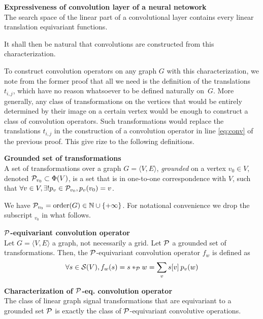 \begin{claim}\textbf{Expressiveness of convolution layer of a neural netowork}\\
The search space of the linear part of a convolutional layer contains every linear translation equivariant functions.
\end{claim}

It shall then be natural that convolutions are constructed from this characterization.

To construct convolution operators on any graph $G$ with this characterization, we note from the former proof that all we need is the definition of the translations $t_{i,j}$, which have no reason whatsoever to be defined naturally on~$G$. More generally, any class of transformations on the vertices that would be entirely determined by their image on a certain vertex would be enough to construct a class of convolution operators. Such transformations would replace the translations $t_{i,j}$ in the construction of a convolution operator in line \eqref{eq:conv} of the previous proof. This give rize to the following definitions.

\begin{definition}\textbf{Grounded set of transformations}\\
A set of transformations over a graph $G = \langle V,E \rangle$, \emph{grounded} on a vertex $v_0 \in V$, denoted $\cp_{v_0} \subset \Phi(V)$, is a set that is in one-to-one correspondence with $V$, such that $\forall v \in V, \exists! p_v \in \cp_{v_0}, p_v(v_0) = v$.
\end{definition}

We have $\cp_{v_0} = \order(G) \in \bbn \cup \{+\infty\}$. For notational convenience we drop the subscript $_{v_0}$ in what follows.

\begin{definition}\textbf{$\cp$-equivariant convolution operator}\\
Let $G = \langle V,E \rangle$ a graph, not necessarily a grid. Let $\cp$ a grounded set of transformations. Then, the  $\cp$-equivariant convolution operator $f_w$ is defined as
\begin{gather*}
\forall s \in \cs(V), f_w(s) = s \ast_{\cp} w = \displaystyle \sum_v s[v] \h{2} p_v(w)
\end{gather*}
\end{definition}

\begin{claim}\textbf{Characterization of $\cp$-eq. convolution operator}\\
The class of linear graph signal transformations that are equivariant to a grounded set $\cp$ is exactly the class of $\cp$-equivariant convolutive operations.
\end{claim}

